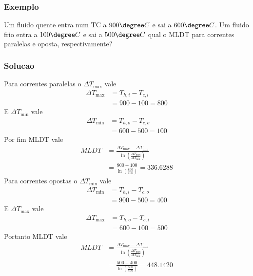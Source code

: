 \subsubsection{Exemplo}
Um fluido quente entra num TC a \(900 \degree C\) e sai a \(600 \degree C\). Um fluido frio entra a
\(100 \degree C\) e sai a \(500 \degree C\) qual o MLDT para correntes paralelas e oposta,
respectivamente?
\subsubsection{Solucao}
Para correntes paralelas o \(\Delta T_{\max }\) vale
\begin{align}
    \Delta T_{\max } &= T_{h,i} - T_{c,i}\\
    &= 900 - 100 = 800
\end{align}
E \(\Delta T_{\min }\) vale
\begin{align}
    \Delta T_{\min } &= T_{h,o} - T_{c,o}\\
    &= 600 - 500 = 100
\end{align}
Por fim MLDT vale
\begin{align}
    MLDT &= \frac{\Delta T_{\max } - \Delta T_{\min }}{\ln \left( \frac{\Delta T_{\max }}{\Delta T_{\min }} \right)} \\
    &= \frac{800 - 100}{\ln \left( \frac{800}{100} \right)} = 336.6288
\end{align}
Para correntes opostas o \(\Delta T_{\min }\) vale
\begin{align}
    \Delta T_{\min } &= T_{h,i} - T_{c,o}\\
    &= 900 - 500 = 400
\end{align}
E \(\Delta T_{\max }\) vale
\begin{align}
    \Delta T_{\max } &= T_{h,o} - T_{c,i}\\
    &= 600 - 100 = 500
\end{align}
Portanto MLDT vale
\begin{align}
    MLDT &= \frac{\Delta T_{\max } - \Delta T_{\min }}{\ln \left( \frac{\Delta T_{\max }}{\Delta T_{\min }} \right)} \\
    &= \frac{500 - 400}{\ln \left( \frac{500}{400} \right)} = 448.1420
\end{align}

